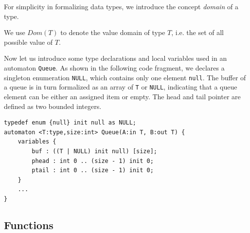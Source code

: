 For simplicity in formalizing data types, we introduce the concept \emph{domain} of a type. 

\begin{formalization}[Domain]
    We use $Dom(T)$ to denote the value domain of type $T$, i.e. the set of all possible value of $T$.
\end{formalization}

\begin{example} Now let us introduce some type declarations and local variables used in an automaton \texttt{Queue}. As shown in the following code fragment, we declares a singleton enumeration \texttt{NULL}, which contains only one element \texttt{null}. The buffer of a queue is in turn formalized as an array of \texttt{T} or \texttt{NULL}, indicating that a queue element can be either an assigned item or empty. The head and tail pointer are defined as two bounded integers.
\begin{lstlisting}
typedef enum {null} init null as NULL;
automaton <T:type,size:int> Queue(A:in T, B:out T) {
    variables {
        buf : ((T | NULL) init null) [size];
        phead : int 0 .. (size - 1) init 0;
        ptail : int 0 .. (size - 1) init 0;
    }
    ...
}
\end{lstlisting}
\end{example}

\subsection{Functions}

